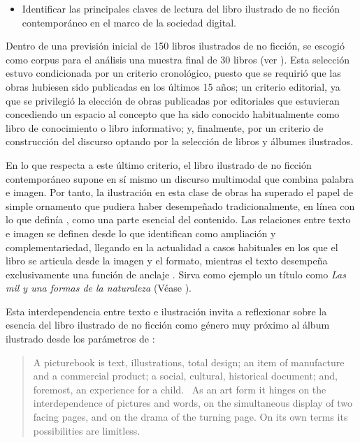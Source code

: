 \documentclass[spanish]{textolivre}
\begin{document}
\begin{itemize}
    \item Identificar las principales claves de lectura del libro ilustrado de no ficción contemporáneo en el marco de la sociedad digital.
\end{itemize}

Dentro de una previsión inicial de 150 libros ilustrados de no ficción, se escogió como corpus para el análisis una muestra final de 30 libros (ver ). Esta selección estuvo condicionada por un criterio cronológico, puesto que se requirió que las obras hubiesen sido publicadas en los últimos 15 años; un criterio editorial, ya que se privilegió la elección de obras publicadas por editoriales que estuvieran concediendo un espacio al concepto que ha sido conocido habitualmente como libro de conocimiento o libro informativo; y, finalmente, por un criterio de construcción del discurso optando por la selección de libros y álbumes ilustrados.

En lo que respecta a este último criterio, el libro ilustrado de no ficción contemporáneo supone en sí mismo un discurso multimodal \cite{kress_multimodality:_2010,canamares-torrijos_estudio_2019,moya_guijarro_libros_2020,unsworth_multiliteracies_2008} que combina palabra e imagen. Por tanto, la ilustración en esta clase de obras ha superado el papel de simple ornamento que pudiera haber desempeñado tradicionalmente, en línea con lo que definía \textcite{bader_american_1976}, como una parte esencial del contenido. Las relaciones entre texto e imagen se definen desde lo que \textcite{nikolajeva_images_2001} identifican como ampliación y complementariedad, llegando en la actualidad a casos habituales en los que el libro se articula desde la imagen y el formato, mientras el texto desempeña exclusivamente una función de anclaje \cite{swartz_choosing_2020}. Sirva como ejemplo un título como \textit{Las mil y una formas de la naturaleza} (Véase ).

Esta interdependencia entre texto e ilustración invita a reflexionar sobre la esencia del libro ilustrado de no ficción como género muy próximo al álbum ilustrado desde los parámetros de \textcite[p. 1]{bader_american_1976}:

\begin{quote}
    A picturebook is text, illustrations, total design; an item of manufacture and a commercial product; a social, cultural, historical document; and, foremost, an experience for a child.  As an art form it hinges on the interdependence of pictures and words, on the simultaneous display of two facing pages, and on the drama of the turning page. On its own terms its possibilities are limitless.
\end{quote}
\end{document}
